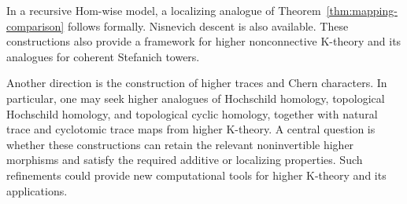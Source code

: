 In a recursive Hom-wise model, a localizing analogue of
Theorem~\ref{thm:mapping-comparison} follows formally.
Nisnevich descent is also available. 
These constructions also provide a framework for
higher nonconnective K-theory and its analogues
for coherent Stefanich towers.

Another direction is the construction of higher
traces and Chern characters. In particular, one
may seek higher analogues of Hochschild homology,
topological Hochschild homology, and topological
cyclic homology, together with natural trace and
cyclotomic trace maps from higher K-theory.
A central question is whether these constructions
can retain the relevant noninvertible higher
morphisms and satisfy the required additive or
localizing properties. Such refinements could
provide new computational tools for higher
K-theory and its applications.
